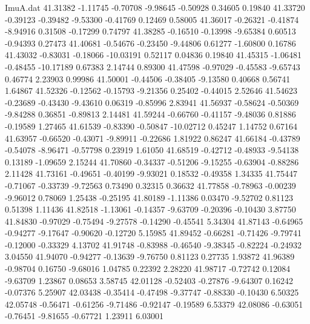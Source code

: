 \begin{filecontents}{ImuA.dat}
  41.31382   -1.11745   -0.70708   -9.98645   -0.50928    0.34605    0.19840
  41.33720   -0.39123   -0.39482   -9.53300   -0.41769    0.12469    0.58005
  41.36017   -0.26321   -0.41874   -8.94916    0.31508   -0.17299    0.74797
  41.38285   -0.16510   -0.13998   -9.65384    0.60513   -0.94393    0.27473
  41.40681   -0.54676   -0.23450   -9.44806    0.61277   -1.60800    0.16786
  41.43032   -0.83031   -0.18066  -10.03191    0.52117    0.04836    0.19840
  41.45315   -1.06481   -0.48455  -10.17189    0.67383    2.14744    0.89300
  41.47598   -0.97029   -0.45583   -9.65743    0.46774    2.23903    0.99986
  41.50001   -0.44506   -0.38405   -9.13580    0.40668    0.56741    1.64867
  41.52326   -0.12562   -0.15793   -9.21356    0.25402   -0.44015    2.52646
  41.54623   -0.23689   -0.43430   -9.43610    0.06319   -0.85996    2.83941
  41.56937   -0.58624   -0.50369   -9.84288    0.36851   -0.89813    2.14481
  41.59244   -0.66760   -0.41157   -9.48036    0.81886   -0.19589    1.27465
  41.61539   -0.83390   -0.50847  -10.02712    0.45247    1.14752    0.67164
  41.63957   -0.66520   -0.43071   -9.89911   -0.22686    1.81922    0.86247
  41.66184   -0.43789   -0.54078   -8.96471   -0.57798    0.23919    1.61050
  41.68519   -0.42712   -0.48933   -9.54138    0.13189   -1.09659    2.15244
  41.70860   -0.34337   -0.51206   -9.15255   -0.63904   -0.88286    2.11428
  41.73161   -0.49651   -0.40199   -9.93021    0.18532   -0.49358    1.34335
  41.75447   -0.71067   -0.33739   -9.72563    0.73490    0.32315    0.36632
  41.77858   -0.78963   -0.00239   -9.96012    0.78069    1.25438   -0.25195
  41.80189   -1.11386    0.03470   -9.52702    0.81123    0.51398    1.11436
  41.82518   -1.13061   -0.14357   -9.63709   -0.20396   -0.10430    3.87750
  41.84830   -0.97029   -0.75494   -9.27578   -0.14290   -0.45541    5.34304
  41.87143   -0.64965   -0.94277   -9.17647   -0.90620   -0.12720    5.15985
  41.89452   -0.66281   -0.71426   -9.79741   -0.12000   -0.33329    4.13702
  41.91748   -0.83988   -0.46540   -9.38345   -0.82224   -0.24932    3.04550
  41.94070   -0.94277   -0.13639   -9.76750    0.81123    0.27735    1.93872
  41.96389   -0.98704    0.16750   -9.68016    1.04785    0.22392    2.28220
  41.98717   -0.72742    0.12084   -9.63709    1.23867    0.08653    3.58745
  42.01128   -0.52403   -0.27876   -9.64307    0.16242   -0.07376    5.25907
  42.03438   -0.35414   -0.47498   -9.37747   -0.88330   -0.10430    6.50325
  42.05748   -0.56471   -0.61256   -9.71486   -0.92147   -0.19589    6.53379
  42.08086   -0.63051   -0.76451   -9.81655   -0.67721    1.23911    6.03001

\end{filecontents}
